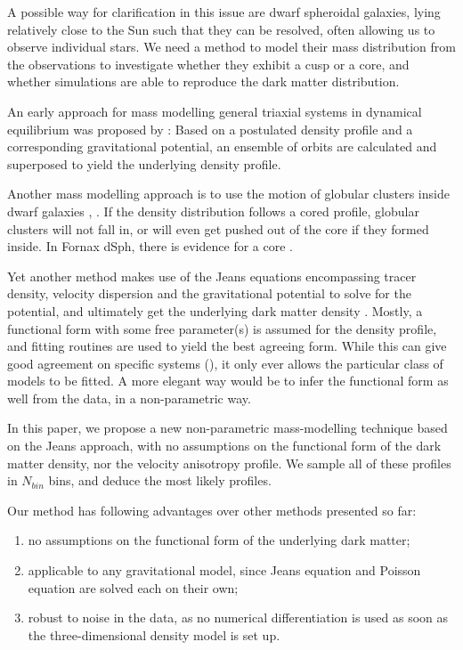 A possible way for clarification in this issue are dwarf spheroidal
galaxies, lying relatively close to the Sun such that they can be
resolved, often allowing us to observe individual stars. We need a
method to model their mass distribution from the observations to
investigate whether they exhibit a cusp or a core, and whether
simulations are able to reproduce the dark matter distribution.

An early approach for mass modelling general triaxial systems in
dynamical equilibrium was proposed by \citet{Schwarzschild1979}: Based
on a postulated density profile and a corresponding gravitational
potential, an ensemble of orbits are calculated and superposed to
yield the underlying density profile.


Another mass modelling approach is to use the motion of globular
clusters inside dwarf galaxies ,
. If the density distribution follows a cored
profile, globular clusters will not fall in, or will even get pushed
out of the core if they formed inside. In Fornax dSph, there is
evidence for a core .


Yet another method makes use of the Jeans equations encompassing tracer
density, velocity dispersion and the gravitational potential to solve
for the potential, and ultimately get the underlying dark matter
density . Mostly, a functional form with
some free parameter(s) is assumed for the density profile, and fitting
routines are used to yield the best agreeing form. While this can give
good agreement on specific systems (), it only ever
allows the particular class of models to be fitted. A more elegant way
would be to infer the functional form as well from the data, in a
non-parametric way.


In this paper, we propose a new non-parametric mass-modelling
technique based on the Jeans approach, with no assumptions on the
functional form of the dark matter density, nor the velocity
anisotropy profile. We sample all of these profiles in $N_{bin}$ bins,
and deduce the most likely profiles.


Our method has following advantages over other methods presented so far:
\begin{enumerate}
\item no assumptions on the functional form of the underlying dark
  matter;
\item applicable to any gravitational model, since Jeans equation and
  Poisson equation are solved each on their own;
\item robust to noise in the data, as no numerical differentiation is
  used as soon as the three-dimensional density model is set up.
\end{enumerate}

